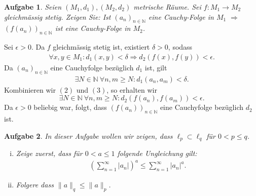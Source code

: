 \documentclass[a4paper, 20]{exam}
\newtheorem{ex}{Aufgabe}
\newcommand\NN{\mathbb{N}}
\begin{document}
\begin{ex}
Seien $(M_1, d_1), (M_2, d_2)$ metrische R\"aume. Sei $f: M_1 \rightarrow M_2$ gleichm\"assig stetig. Zeigen Sie:
Ist $(a_n)_{n\in \NN}$ eine Cauchy-Folge in $M_1$ $\Rightarrow$ $(f(a_n))_{n\in \NN}$ ist eine Cauchy-Folge in $M_2$.
\end{ex}
\begin{solution}
Sei $\epsilon>0$. Da $f$ gleichm\"assig stetig ist, existiert $\delta>0$, sodass
\begin{align}
\forall x,y \in M_1: d_1(x,y)<\delta \Rightarrow d_2(f(x),f(y))<\epsilon.
\end{align}
Da $(a_n)_{n\in \NN}$ eine Cauchyfolge bez\"uglich $d_1$ ist, gilt
\begin{align}
\exists N \in \NN \ \forall n,m\geq N: d_1(a_n, a_m)<\delta.
\end{align}
Kombinieren wir $(2)$ und $(3)$, so erhalten wir
$$ \exists N\in \NN \ \forall n,m \geq N: d_2(f(a_n), f(a_m)) < \epsilon.$$
Da $\epsilon>0$ beliebig war, folgt, dass $(f(a_n))_{n\in \NN}$ eine Cauchyfolge bez\"uglich $d_2$ ist.
\end{solution}

\begin{ex} In dieser Aufgabe wollen wir zeigen, dass $\ell_p \subset \ell_q$ für $0 <p \leq q$. 
\begin{enumerate}[i)]
\item Zeige zuerst, dass für $0< a \leq 1$ folgende Ungleichung gilt:
\begin{align*}
\left( \sum_{n=1}^\infty |a_n| \right)^a \leq \sum_{n=1}^\infty |a_n|^a.
\end{align*}
\item Folgere dass $\|a\|_q \leq \|a \|_p$.
\end{enumerate}
\end{ex}
\end{document}
